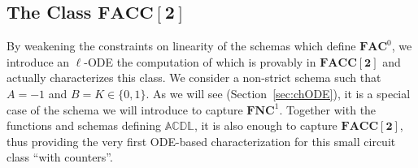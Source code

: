 \documentclass[11pt, oneside]{article}
\newcommand{\ACDL}{\mathbb{ACDL}}
\newcommand{\fun}[1]{\mathsf{#1}}
\newcommand{\NC}{\mathbf{FNC}}
\newcommand{\AC}{\mathbf{FAC}}
\newcommand{\FACC}{\mathbf{FACC[2]}}
\newcommand{\tu}[1]{\mathbf{#1}}
\theoremstyle{definition}
\begin{document}
\subsection{The Class $\FACC$}

By weakening the constraints on linearity of the schemas which define $\AC^0$, we introduce an $\ell$-ODE the computation of which is provably in $\FACC$ and actually characterizes this class.
%
We consider a non-strict schema such that $A=-1$ and $B=K\in \{0,1\}$.
%
As we will see (Section~\ref{sec:chODE}), it is a special case of the schema we will introduce to capture $\NC^1$.
%
Together with the functions and schemas defining $\ACDL$, it is also enough to capture $\FACC$, thus providing the very first ODE-based characterization for this small circuit class  ``with counters''. 
\end{document}
